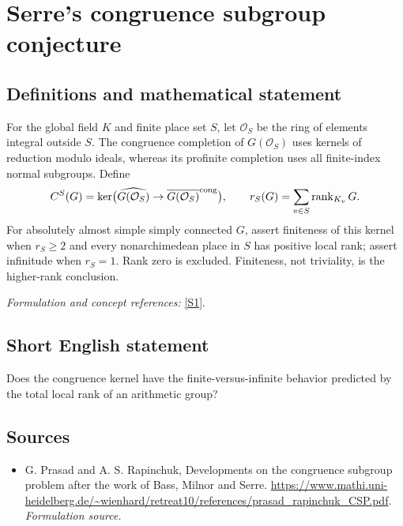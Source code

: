 \documentclass[11pt]{article}
\begin{document}
\section*{\texorpdfstring{Serre's congruence subgroup conjecture}{Serre's congruence subgroup conjecture}}\label{119}
\subsection{Definitions and mathematical statement}
For the global field $K$ and finite place set $S$, let $\mathcal O_S$ be the ring of elements integral outside $S$. The congruence completion of $G(\mathcal O_S)$ uses kernels of reduction modulo ideals, whereas its profinite completion uses all finite-index normal subgroups. Define
\[
 C^S(G)=\ker\bigl(\widehat{G(\mathcal O_S)}\to\overline{G(\mathcal O_S)}^{\rm cong}\bigr),
 \qquad r_S(G)=\sum_{v\in S}\operatorname{rank}_{K_v}G.
\]
For absolutely almost simple simply connected $G$, assert finiteness of this kernel when $r_S\ge2$ and every nonarchimedean place in $S$ has positive local rank; assert infinitude when $r_S=1$. Rank zero is excluded. Finiteness, not triviality, is the higher-rank conclusion.
\par\smallskip\textit{Formulation and concept references:} \href{https://www.mathi.uni-heidelberg.de/~wienhard/retreat10/references/prasad_rapinchuk_CSP.pdf}{[S1]}.

\subsection{Short English statement}
Does the congruence kernel have the finite-versus-infinite behavior predicted by the total local rank of an arithmetic group?
\subsection{Sources}
\begin{itemize}
\item[S1]G. Prasad and A. S. Rapinchuk, Developments on the congruence subgroup problem after the work of Bass, Milnor and Serre.
\url{https://www.mathi.uni-heidelberg.de/~wienhard/retreat10/references/prasad_rapinchuk_CSP.pdf}.
\textit{Formulation source.}
\end{itemize}
\end{document}
